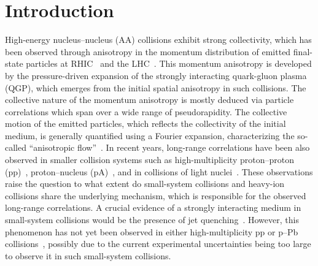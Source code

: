 
\section{Introduction}
\label{sec:intro}

High-energy nucleus--nucleus (AA) collisions exhibit strong collectivity, which has been observed through anisotropy in the momentum distribution of emitted final-state particles at RHIC~\cite{Adams:2005dq,Adcox:2004mh,Arsene:2004fa,Back:2004je} and the LHC~\cite{Abelev:2012di, Abelev:2014pua, ATLAS:2011ah,ALICE:2022wpn}. This momentum anisotropy is developed by the pressure-driven expansion of the strongly interacting quark-gluon plasma (QGP), which emerges from the initial spatial anisotropy in such collisions.
The collective nature of the momentum anisotropy is mostly deduced via particle correlations which span over a wide range of pseudorapidity. The collective motion of the emitted particles, which reflects the collectivity of the initial medium, is generally quantified using a Fourier expansion, characterizing the so-called ``anisotropic flow''~\cite{Ollitrault:1992bk}. In recent years, long-range correlations have been also observed in smaller collision systems such as high-multiplicity proton--proton (pp)~\cite{ATLAS:2015hzw,Khachatryan:2015lva,Khachatryan:2016txc,Acharya:2019vdf,ATLAS:2017rtr}, proton--nucleus (pA)~\cite{ALICE:2012eyl,ATLAS:2014qaj,ATLAS:2016yzd,Khachatryan:2016ibd}, and in collisions of light nuclei~\cite{PHENIX:2018lia,Aidala:2017ajz}. 
These observations raise the question to what extent do small-system collisions and heavy-ion collisions share the underlying mechanism, which is responsible for the observed long-range correlations.
A crucial evidence of a strongly interacting medium in small-system collisions would be the presence of jet quenching~\cite{Gyulassy:1990ye,Wang:1991xy}. However, this phenomenon has not yet been observed in either high-multiplicity pp or p--Pb collisions~\cite{Adam:2014qja,Khachatryan:2016odn,Adam:2016jfp,Adam:2016dau,Acharya:2017okq}, possibly due to the current experimental uncertainties being too large to observe it in such small-system collisions.

